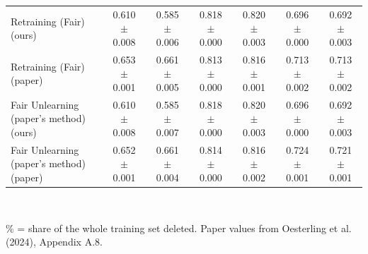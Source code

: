 \begin{table}[t]
\begin{tabular}{lcccccc}
Retraining (Fair) (ours) & 0.610 $\pm$ 0.008 & 0.585 $\pm$ 0.006 & 0.818 $\pm$ 0.000 & 0.820 $\pm$ 0.003 & 0.696 $\pm$ 0.000 & 0.692 $\pm$ 0.003 \\
Retraining (Fair) (paper) & 0.653 $\pm$ 0.001 & 0.661 $\pm$ 0.005 & 0.813 $\pm$ 0.000 & 0.816 $\pm$ 0.001 & 0.713 $\pm$ 0.002 & 0.713 $\pm$ 0.002 \\
Fair Unlearning (paper's method) (ours) & 0.610 $\pm$ 0.008 & 0.585 $\pm$ 0.007 & 0.818 $\pm$ 0.000 & 0.820 $\pm$ 0.003 & 0.696 $\pm$ 0.000 & 0.692 $\pm$ 0.003 \\
Fair Unlearning (paper's method) (paper) & 0.652 $\pm$ 0.001 & 0.661 $\pm$ 0.004 & 0.814 $\pm$ 0.000 & 0.816 $\pm$ 0.002 & 0.724 $\pm$ 0.001 & 0.721 $\pm$ 0.001 \\
\hline
\end{tabular}
\\[2pt]\parbox{\textwidth}{\footnotesize \% = share of the whole training set deleted. Paper values from Oesterling et al. (2024), Appendix A.8.}
\end{table}
